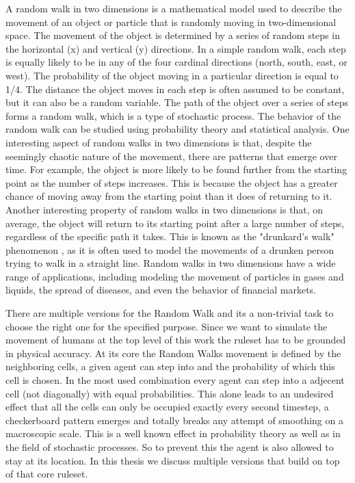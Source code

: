 A random walk in two dimensions is a mathematical model used to describe the movement of an object or particle that is randomly moving in two-dimensional space. 
The movement of the object is determined by a series of random steps in the horizontal (x) and vertical (y) directions.
In a simple random walk, each step is equally likely to be in any of the four cardinal directions (north, south, east, or west). 
The probability of the object moving in a particular direction is equal to 1/4. The distance the object moves in each step is often assumed to be constant, 
but it can also be a random variable.
The path of the object over a series of steps forms a random walk, which is a type of stochastic process. The behavior of the random walk 
can be studied using probability theory and statistical analysis. 
One interesting aspect of random walks in two dimensions is that, despite the seemingly chaotic nature of the movement, there are patterns that emerge over time. 
For example, the object is more likely to be found further from the starting point as the number of steps increases. 
This is because the object has a greater chance of moving away from the starting point than it does of returning to it.
Another interesting property of random walks in two dimensions is that, on average, the object will return to its starting point after a large number of steps, 
regardless of the specific path it takes. This is known as the "drunkard's walk" phenomenon \autocite{ehrhardt2013not}, as it is often used to model the movements of a drunken person trying to walk in a straight line.
Random walks in two dimensions have a wide range of applications, including modeling the movement of particles in gases and liquids, 
the spread of diseases, and even the behavior of financial markets.

There are multiple versions for the Random Walk and its a non-trivial task to choose the right one for the specified purpose. 
Since we want to simulate the movement of humans at the top level of this work the ruleset has to be grounded in physical accuracy. 
At its core the Random Walks movement is defined by the neighboring cells, a given agent can step into and the probability of which this cell is chosen. 
In the most used combination every agent can step into a adjecent cell (not diagonally) with equal probabilities.
This alone leads to an undesired effect that all the cells can only be occupied exactly every second timestep, a checkerboard pattern 
emerges and totally breaks any attempt of smoothing on a macroscopic scale. 
This is a well known effect in probability theory as well as in the field of stochastic processes.
So to prevent this the agent is also allowed to stay at its location. 
In this thesis we discuss multiple versions that build on top of that core ruleset. 

